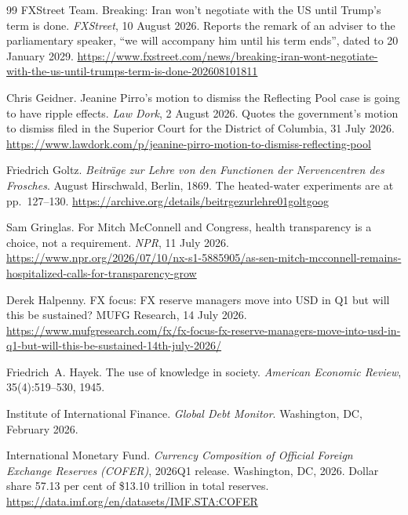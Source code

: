 \documentclass[11pt,a4paper]{article}
\theoremstyle{remark}
\begin{document}
\begin{thebibliography}{99}
FXStreet Team.
\newblock Breaking: Iran won't negotiate with the US until Trump's term is done.
\newblock \emph{FXStreet}, 10 August 2026. Reports the remark of an adviser to the parliamentary speaker,
``we will accompany him until his term ends'', dated to 20 January 2029.
\newblock \url{https://www.fxstreet.com/news/breaking-iran-wont-negotiate-with-the-us-until-trumps-term-is-done-202608101811}

Chris Geidner.
\newblock Jeanine Pirro's motion to dismiss the Reflecting Pool case is going to have ripple effects.
\newblock \emph{Law Dork}, 2 August 2026. Quotes the government's motion to dismiss filed in the
Superior Court for the District of Columbia, 31 July 2026.
\newblock \url{https://www.lawdork.com/p/jeanine-pirro-motion-to-dismiss-reflecting-pool}

Friedrich Goltz.
\newblock \emph{Beitr\"{a}ge zur Lehre von den Functionen der Nervencentren des Frosches}.
\newblock August Hirschwald, Berlin, 1869. The heated-water experiments are at pp.~127--130.
\newblock \url{https://archive.org/details/beitrgezurlehre01goltgoog}

Sam Gringlas.
\newblock For Mitch McConnell and Congress, health transparency is a choice, not a requirement.
\newblock \emph{NPR}, 11 July 2026.
\newblock \url{https://www.npr.org/2026/07/10/nx-s1-5885905/as-sen-mitch-mcconnell-remains-hospitalized-calls-for-transparency-grow}


Derek Halpenny.
\newblock FX focus: FX reserve managers move into USD in Q1 but will this be sustained?
\newblock MUFG Research, 14 July 2026.
\newblock \url{https://www.mufgresearch.com/fx/fx-focus-fx-reserve-managers-move-into-usd-in-q1-but-will-this-be-sustained-14th-july-2026/}

Friedrich~A. Hayek.
\newblock The use of knowledge in society.
\newblock \emph{American Economic Review}, 35(4):519--530, 1945.

Institute of International Finance.
\newblock \emph{Global Debt Monitor}.
\newblock Washington, DC, February 2026.

International Monetary Fund.
\newblock \emph{Currency Composition of Official Foreign Exchange Reserves (COFER)}, 2026Q1 release.
\newblock Washington, DC, 2026. Dollar share 57.13 per cent of \$13.10 trillion in total reserves.
\newblock \url{https://data.imf.org/en/datasets/IMF.STA:COFER}


\end{thebibliography}
\end{document}
